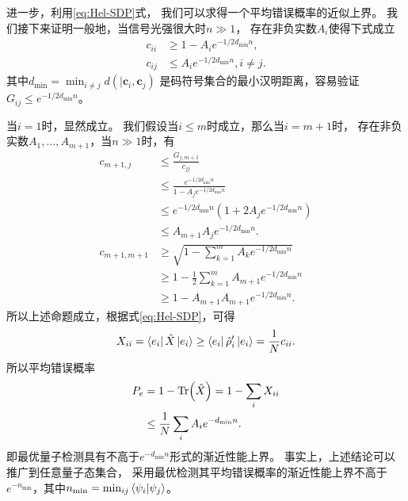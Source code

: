 进一步，利用\ref{eq:Hel-SDP}式，
我们可以求得一个平均错误概率的近似上界。
我们接下来证明一般地，当信号光强很大时$n \gg 1$，
存在非负实数$A_i$使得下式成立
\begin{equation}
\begin{split}
c_{ii} & \ge 1 - A_i e^{-1/2 d_{\min} n}, \\
c_{ij} & \le A_i e^{-1/2 d_{\min} n}, i\neq j.
\end{split}
\end{equation}
其中$d_{\min} = \min_{i \neq j} d(|\bm{c}_i , \bm{c}_j)$
是码符号集合的最小汉明距离，容易验证$G_{ij} \le e^{-1/2 d_{\min} n}$。

当$i=1$时，显然成立。
我们假设当$i\le m$时成立，那么当$i=m+1$时，
存在非负实数$A_1, ..., A_{m+1}$，当$n \gg 1$时，有
\begin{equation}
\begin{split}
c_{m+1,j} & \le \frac{G_{j,m+1}}{c_{jj}} \\
       & \le \frac{e^{-1/2 d_{\min} n}}{1 - A_j e^{-1/2 d_{\min} n}}   \\
       & \le e^{-1/2 d_{\min} n} \left(  1 + 2 A_j e^{-1/2 d_{\min} n} \right)  \\
       & \le A_{m+1} A_j e^{-1/2 d_{\min} n}. \\
c_{m+1,m+1} &\ge \sqrt{1 - \sum_{k=1}^{m} A_k e^{-1/2 d_{\min} n} } \\
            &\ge 1 - \frac{1}{2}\sum_{k=1}^{m} A_{m+1} e^{-1/2 d_{\min} n} \\
            &\ge 1 - A_{m+1} A_{m+1} e^{-1/2 d_{\min} n}.
\end{split}
\end{equation}
所以上述命题成立，根据式\ref{eq:Hel-SDP}，可得
\begin{equation}
\begin{split}
X_{ii} = \bra{e_i} \hat{X} \ket{e_i} \ge \bra{e_i} \hat{\rho}_i' \ket{e_i} = \frac{1}{N} c_{ii}  .
\end{split}
\end{equation}
所以平均错误概率
\begin{equation}
\begin{split}
P_e &= 1 - \Tr(\hat{X}) =  1 - \sum_i X_{ii} \\
    &\le \frac{1}{N} \sum_i A_i e^{- d_{\min} n}.
\end{split}
\end{equation}
即最优量子检测具有不高于$e^{- d_{\min} n}$形式的渐近性能上界。
事实上，上述结论可以推广到任意量子态集合，
采用最优检测其平均错误概率的渐近性能上界不高于
$e^{-n_{\min}}$，其中$n_{\min} = \min_{ij} \bra{\psi_i}\ket{\psi_j}$。

